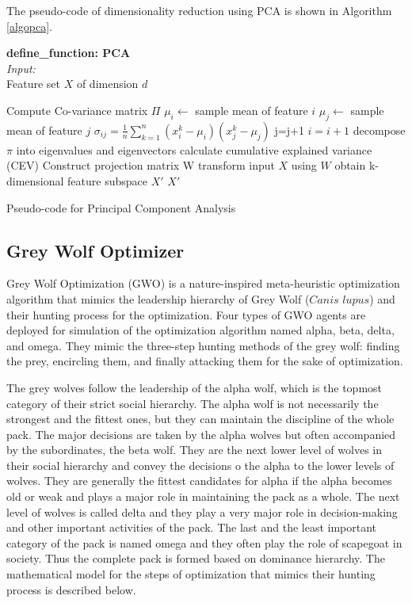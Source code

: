 \documentclass{llncs}
\begin{document}
The pseudo-code of dimensionality reduction using PCA is shown in Algorithm \ref{algopca}.

\begin{algorithm}
    {\small
    \textbf{define\_function: PCA}\\
    {\em Input:}\\
    Feature set $X$ of dimension $d$
    \begin{algorithmic}
        \STATE Compute Co-variance matrix $\Pi$
        \STATE{}
            \STATE{}
               \STATE $\mu_i \longleftarrow$ sample mean of feature $i$ 
               \STATE $\mu_j \longleftarrow$ sample mean of feature $j$
               \STATE $\sigma_{ij}=\frac{1}{n}\sum\limits_{k=1}^n(x_i^k-\mu_i)(x_j^k-\mu_j)$
               \STATE j=j+1
            \ENDWHILE
            \STATE $i=i+1$
        \ENDWHILE
        \STATE decompose $\pi$ into eigenvalues and eigenvectors
        \STATE calculate cumulative explained variance (CEV)
        \STATE{}
            \STATE Construct projection matrix W
        \ENDIF
        \STATE transform input $X$ using $W$
        \STATE obtain k-dimensional feature subspace $X'$
         $X'$
        
    \end{algorithmic}
    }
\caption{Pseudo-code for Principal Component Analysis}
\label{algopca}
\end{algorithm}
\subsection{Grey Wolf Optimizer}
Grey Wolf Optimization (GWO) \cite{mirjalili2014grey} is a nature-inspired meta-heuristic optimization algorithm that mimics the leadership hierarchy of Grey Wolf ($Canis$ $lupus$) and their hunting process for the optimization. Four types of GWO agents are deployed for simulation of the optimization algorithm named alpha, beta, delta, and omega. They mimic the three-step hunting methods of the grey wolf: finding the prey, encircling them, and finally attacking them for the sake of optimization. 

The grey wolves follow the leadership of the alpha wolf, which is the topmost category of their strict social hierarchy. The alpha wolf is not necessarily the strongest and the fittest ones, but they can maintain the discipline of the whole pack. The major decisions are taken by the alpha wolves but often accompanied by the subordinates, the beta wolf. They are the next lower level of wolves in their social hierarchy and convey the decisions o the alpha to the lower levels of wolves. They are generally the fittest candidates for alpha if the alpha becomes old or weak and plays a major role in maintaining the pack as a whole. The next level of wolves is called delta and they play a very major role in decision-making and other important activities of the pack. The last and the least important category of the pack is named omega and they often play the role of scapegoat in society. Thus the complete pack is formed based on dominance hierarchy. The mathematical model for the steps of optimization that mimics their hunting process is described below.
\end{document}
